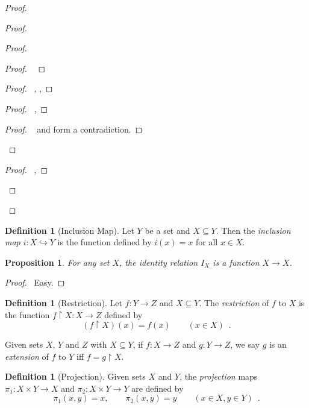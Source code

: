 \documentclass{report}
\let\qed\relax
\newtheorem{prop}[ax]{Proposition}
\theoremstyle{definition}
\newtheorem{df}[ax]{Definition}
\begin{document}
\begin{proof}
\begin{proof}
\begin{proof}
		\begin{proof}
			\pf\ 
		\end{proof}
		\begin{proof}
			\pf\ , , 
		\end{proof}
		\begin{proof}
			\pf\ , 
		\end{proof}
		\qedstep
		\begin{proof}
			\pf\  and  form a contradiction.
		\end{proof}
	\end{proof}
	\begin{proof}
		\pf\ , 
	\end{proof}
\end{proof}
\qed
\end{proof}

\begin{df}[Inclusion Map]
Let $Y$ be a set and $X \subseteq Y$. Then the \emph{inclusion map} $i : X \hookrightarrow Y$ is the function defined by $i(x) = x$ for all $x \in X$.
\end{df}

\begin{prop}
For any set $X$, the identity relation $I_X$ is a function $X \rightarrow X$.
\end{prop}

\begin{proof}
\pf\ Easy. \qed
\end{proof}

\begin{df}[Restriction]
Let $f : Y \rightarrow Z$ and $X \subseteq Y$. The \emph{restriction} of $f$ to $X$ is the function $f \restriction X : X \rightarrow Z$ defined by
\[ (f \restriction X)(x) = f(x) \qquad (x \in X) \enspace . \]

Given sets $X$, $Y$ and $Z$ with $X \subseteq Y$, if $f : X \rightarrow Z$ and $g : Y \rightarrow Z$, we say $g$ is an \emph{extension} of $f$ to $Y$ iff $f = g \restriction X$.
\end{df}

\begin{df}[Projection]
Given sets $X$ and $Y$, the \emph{projection} maps $\pi_1 : X \times Y \rightarrow X$ and $\pi_2 : X \times Y \rightarrow Y$ are defined by
\[ \pi_1(x,y) = x, \qquad \pi_2(x,y) = y \qquad (x \in X, y \in Y) \enspace . \]
\end{df}
\end{document}
